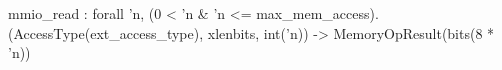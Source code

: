 mmio_read : forall 'n, (0 < 'n & 'n <= max_mem_access).
  (AccessType(ext_access_type), xlenbits, int('n)) -> MemoryOpResult(bits(8 * 'n))